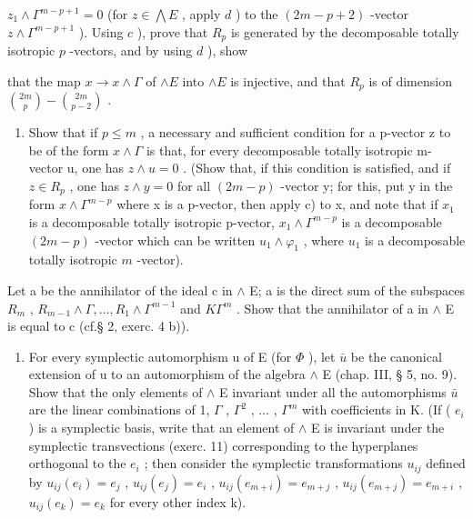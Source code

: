 \(z_{1} \wedge \Gamma^{m-p+1} = 0\) (for \(z \in \bigwedge E\) , apply \(d\) ) to the \((2m - p + 2)\) -vector \(z \wedge \Gamma^{m-p+1}\) ). Using \(c\) ), prove that \(R_{p}\) is generated by the decomposable totally isotropic \(p\) -vectors, and by using \(d\) ), show

that the map \(x \to x \wedge \Gamma\) of \(\wedge E\) into \(\wedge E\) is injective, and that \(R_p\) is of dimension \(\binom{2m}{p} - \binom{2m}{p-2}\) .

\begin{enumerate}
\def\labelenumi{\alph{enumi})}
\setcounter{enumi}{5}
\tightlist
\item
  Show that if \(p \leqslant m\) , a necessary and sufficient condition for a p-vector z to be of the form \(x \wedge \Gamma\) is that, for every decomposable totally isotropic m-vector u, one has \(z \wedge u = 0\) . (Show that, if this condition is satisfied, and if \(z \in R_{p}\) , one has \(z \wedge y = 0\) for all \((2m - p)\) -vector y; for this, put y in the form \(x \wedge \Gamma^{m-p}\) where x is a p-vector, then apply c) to x, and note that if \(x_{1}\) is a decomposable totally isotropic p-vector, \(x_{1} \wedge \Gamma^{m-p}\) is a decomposable \((2m - p)\) -vector which can be written \(u_{1} \wedge \varphi_{1}\) , where \(u_{1}\) is a decomposable totally isotropic \(m\) -vector).
\end{enumerate}

Let a be the annihilator of the ideal c in \(\wedge\) E; a is the direct sum of the subspaces \(R_{m}\) , \(R_{m-1} \wedge \Gamma, \ldots, R_{1} \wedge \Gamma^{m-1}\) and \(K\Gamma^{m}\) . Show that the annihilator of a in \(\wedge\) E is equal to c (cf.§ 2, exerc. 4 b)).

\begin{enumerate}
\def\labelenumi{\alph{enumi})}
\setcounter{enumi}{6}
\tightlist
\item
  For every symplectic automorphism u of E (for \(\Phi\) ), let \(\bar{u}\) be the canonical extension of u to an automorphism of the algebra \(\wedge\) E (chap. III, § 5, no. 9). Show that the only elements of \(\wedge\) E invariant under all the automorphisms \(\bar{u}\) are the linear combinations of 1, \(\Gamma\) , \(\Gamma^{2}\) , \(\ldots\) , \(\Gamma^{m}\) with coefficients in K. (If ( \(e_{i}\) ) is a symplectic basis, write that an element of \(\wedge\) E is invariant under the symplectic transvections (exerc. 11) corresponding to the hyperplanes orthogonal to the \(e_{i}\) ; then consider the symplectic transformations \(u_{ij}\) defined by \(u_{ij}(e_{i}) = e_{j}\) , \(u_{ij}(e_{j}) = e_{i}\) , \(u_{ij}(e_{m+i}) = e_{m+j}\) , \(u_{ij}(e_{m+j}) = e_{m+i}\) , \(u_{ij}(e_{k}) = e_{k}\) for every other index k).
\end{enumerate}

